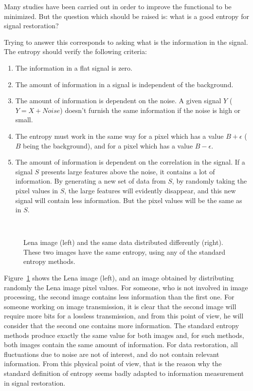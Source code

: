 \documentclass[11pt,a4paper]{article}
\begin{document}
Many studies \cite{weir92,bontekoe94,pantin96} 
have been carried out in order to improve the functional to be minimized.
But the question which should be raised is: what is a good entropy for 
signal restoration?

Trying to answer this corresponds to asking what is the information
in the signal. The entropy should verify the following criteria:
\begin{enumerate}
\item The information in a flat signal is zero.
\item The amount of information in a signal is independent of the background.
\item The amount of information is dependent on the noise. A given 
signal $Y$ ($Y = X + Noise$) doesn't furnish the  same information if 
the noise is high or small.
\item The entropy must work in the same way for a pixel which
has a value $B + \epsilon$ ($B$ being the background), and
for a pixel which has a value $B - \epsilon$.
\item The amount of information is dependent on the correlation in the signal.
If a signal $S$  presents large features above the noise, it contains
a lot of information. By generating a new set of  data from $S$, by 
randomly taking the pixel values in $S$, the large features will
evidently disappear, and this new signal will contain less information.
But the pixel values will be the same as in $S$.
\end{enumerate}

\begin{figure}[htb]
\centerline{
\hbox{
}}
\caption{Lena image (left) and the same data distributed differently (right). 
These
two images have the same entropy, using any of the standard entropy methods.}
\label{fig_lenna}
\end{figure}

Figure~\ref{fig_lenna} shows the Lena image (left), and an image obtained 
by distributing randomly the Lena image pixel values. For someone, who is
not involved in image processing, the second image contains less information
than the first one. For someone working on image transmission, it is clear
that the second image will require more bits for a lossless transmission,
and from this point of view, he will consider that the second one contains
more information. The standard entropy methods produce exactly 
the same value for both images and, for such methods, both images contain
the same amount of information. For data restoration, all fluctuations
due to noise are not of interest, and do not contain relevant 
information.  From this physical point of view, that is the reason why 
the standard 
definition of entropy seems badly adapted to information measurement 
in signal restoration.
\end{document}

